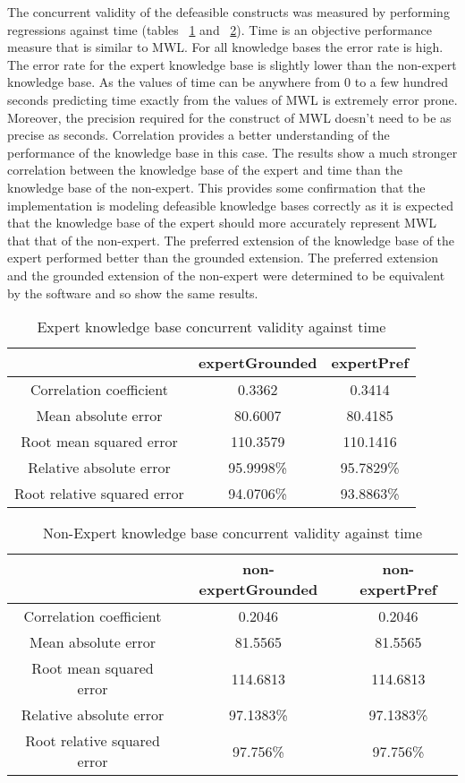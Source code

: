 The concurrent validity of the defeasible constructs was measured by performing regressions against time (tables ~\ref{tab:eccurrent_time} and ~\ref{tab:neccurrent_time}). Time is an objective performance measure that is similar to MWL. For all knowledge bases the error rate is high. The error rate for the expert knowledge base is slightly lower than the non-expert knowledge base. As the values of time can be anywhere from 0 to a few hundred seconds predicting time exactly from the values of MWL is extremely error prone. Moreover, the precision required for the construct of MWL doesn't need to be as precise as seconds. Correlation provides a better understanding of the performance of the knowledge base in this case. The results show a much stronger correlation between the knowledge base of the expert and time than the knowledge base of the non-expert. This provides some confirmation that the implementation is modeling defeasible knowledge bases correctly as it is expected that the knowledge base of the expert should more accurately represent MWL that that of the non-expert. The preferred extension of the knowledge base of the expert performed better than the grounded extension. The preferred extension and the grounded extension of the non-expert were determined to be equivalent by the software and so show the same results.

\begin{table}[!htbp]
\centering
\begin{tabular}{|c|c|c|}
\hline
                            &  expertGrounded & expertPref \\ \hline
Correlation coefficient     & 0.3362        & 0.3414      \\
Mean absolute error         & 80.6007       & 80.4185     \\
Root mean squared error     & 110.3579      & 110.1416  \\
Relative absolute error     & 95.9998\%     & 95.7829\% \\
Root relative squared error & 94.0706\%     & 93.8863\% \\
\hline
\end{tabular}
\caption{Expert knowledge base concurrent validity against time}
\label{tab:eccurrent_time}
\end{table}

\begin{table}[!htbp]
\centering
\begin{tabular}{|c|c|c|}
\hline
                            &   non-expertGrounded  & non-expertPref \\ \hline
Correlation coefficient     &  0.2046         & 0.2046  \\
Mean absolute error         &  81.5565        & 81.5565  \\
Root mean squared error     & 114.6813       & 114.6813  \\
Relative absolute error     & 97.1383\%      & 97.1383\%  \\
Root relative squared error & 97.756\%       & 97.756\%  \\
\hline
\end{tabular}
\caption{Non-Expert knowledge base concurrent validity against time}
\label{tab:neccurrent_time}
\end{table}

